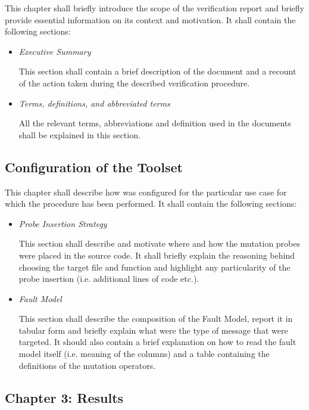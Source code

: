   This chapter shall briefly introduce the scope of the verification report and briefly provide essential information on its context and motivation.
  It shall contain the following sections:
  \begin{itemize}


    \item \emph{Executive Summary}


    This section shall contain a brief description of the document and a recount of the action taken during the described verification procedure.


    \item \emph{Terms, definitions, and abbreviated terms}


    All the relevant terms, abbreviations and definition used in the documents shall be explained in this section.


  \end{itemize}


  \subsection{Configuration of the Toolset}


  This chapter shall describe how \DAMA was configured for the particular use case for which the procedure has been performed.
  It shall contain the following sections:
  \begin{itemize}


    \item \emph{Probe Insertion Strategy}


    This section shall describe and motivate where and how the mutation probes were placed in the source code. It shall briefly explain the reasoning behind choosing the target file and function and highlight any particularity of the probe insertion (i.e. additional lines of code etc.).


    \item \emph{Fault Model}


    This section shall describe the composition of the Fault Model, report it in tabular form and briefly explain what were the type of message that were targeted. It should also contain a brief explanation on how to read the fault model itself (i.e. meaning of the columns) and a table containing the definitions of the mutation operators.


  \end{itemize}


  \subsection{Chapter 3: Results}


